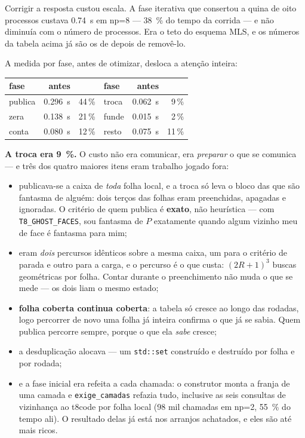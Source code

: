 Corrigir a resposta custou escala. A fase iterativa que consertou a quina de
oito processos custava \SI{0.74}{\second} em np=8 --- \SI{38}{\percent} do
tempo da corrida --- e não diminuía com o número de processos. Era o teto do
esquema MLS, e os números da tabela acima já são os de depois de removê-lo.

A medida por fase, antes de otimizar, desloca a atenção inteira:

\begin{center}
\begin{tabular}{lrrlrr}
\toprule
fase & antes & & fase & antes & \\
\midrule
publica & \SI{0.296}{\second} & 44\,\% & troca & \SI{0.062}{\second} & 9\,\% \\
zera    & \SI{0.138}{\second} & 21\,\% & funde & \SI{0.015}{\second} & 2\,\% \\
conta   & \SI{0.080}{\second} & 12\,\% & resto & \SI{0.075}{\second} & 11\,\% \\
\bottomrule
\end{tabular}
\end{center}

\textbf{A troca era \SI{9}{\percent}.} O custo não era comunicar, era
\emph{preparar} o que se comunica --- e três dos quatro maiores itens eram
trabalho jogado fora:

\begin{itemize}
\item publicava-se a caixa de \emph{toda} folha local, e a troca só leva o
      bloco das que são fantasma de alguém: dois terços das folhas eram
      preenchidas, apagadas e ignoradas. O critério de quem publica é
      \textbf{exato}, não heurística --- com \texttt{T8\_GHOST\_FACES}, sou
      fantasma de $P$ exatamente quando algum vizinho meu de face é fantasma
      para mim;
\item eram \emph{dois} percursos idênticos sobre a mesma caixa, um para o
      critério de parada e outro para a carga, e o percurso é o que custa:
      $(2R+1)^3$ buscas geométricas por folha. Contar durante o preenchimento
      não muda o que se mede --- os dois liam o mesmo estado;
\item \textbf{folha coberta continua coberta}: a tabela só cresce ao longo das
      rodadas, logo percorrer de novo uma folha já inteira confirma o que já se
      sabia. Quem publica percorre sempre, porque o que ela \emph{sabe} cresce;
\item a desduplicação alocava --- um \texttt{std::set} construído e destruído
      por folha e por rodada;
\item e a fase inicial era refeita a cada chamada: o construtor monta a franja
      de uma camada e \texttt{exige\_camadas} refazia tudo, inclusive as seis
      consultas de vizinhança ao t8code por folha local (98 mil chamadas em
      np=2, \SI{55}{\percent} do tempo ali). O resultado delas já está nos
      arranjos achatados, e eles são até mais ricos.
\end{itemize}

